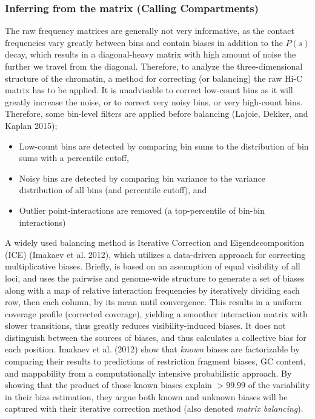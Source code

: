 \documentclass[
  11pt,
  a4paper,
]{scrbook}
\providecommand{\tightlist}{%
  \setlength{\itemsep}{0pt}\setlength{\parskip}{0pt}}\usepackage{longtable,booktabs,array}
\let\oldemph\emph
\renewcommand\emph[1]{\oldemph{\color{gray}#1}}
\begin{document}
\subsubsection{Inferring from the matrix (Calling
Compartments)}\label{inferring-from-the-matrix-calling-compartments}

The raw frequency matrices are generally not very informative, as the
contact frequencies vary greatly between bins and contain biases in
addition to the \(P(s)\) decay, which results in a diagonal-heavy matrix
with high amount of noise the further we travel from the diagonal.
Therefore, to analyze the three-dimensional structure of the chromatin,
a method for correcting (or balancing) the raw Hi-C matrix has to be
applied. It is unadvisable to correct low-count bins as it will greatly
increase the noise, or to correct very noisy bins, or very high-count
bins. Therefore, some bin-level filters are applied before balancing
(Lajoie, Dekker, and Kaplan 2015);

\begin{itemize}
\tightlist
\item
  Low-count bins are detected by comparing bin sums to the distribution
  of bin sums with a percentile cutoff,
\item
  Noisy bins are detected by comparing bin variance to the variance
  distribution of all bins (and percentile cutoff), and
\item
  Outlier point-interactions are removed (a top-percentile of bin-bin
  interactions)
\end{itemize}

A widely used balancing method is Iterative Correction and
Eigendecomposition (ICE) (Imakaev et al. 2012), which utilizes a
data-driven approach for correcting multiplicative biases. Briefly, is
based on an assumption of equal visibility of all loci, and uses the
pairwise and genome-wide structure to generate a set of biases along
with a map of relative interaction frequencies by iteratively dividing
each row, then each column, by its mean until convergence. This results
in a uniform coverage profile (corrected coverage), yielding a smoother
interaction matrix with slower transitions, thus greatly reduces
visibility-induced biases. It does not distinguish between the sources
of biases, and thus calculates a collective bias for each position.
Imakaev et al. (2012) show that \emph{known} biases are factorizable by
comparing their results to predictions of restriction fragment biases,
GC content, and mappability from a computationally intensive
probabilistic approach. By showing that the product of those known
biases explain \(>99.99%
\) of the variability in their bias estimation, they argue both known
and unknown biases will be captured with their iterative correction
method (also denoted \emph{matrix balancing}).
\end{document}
